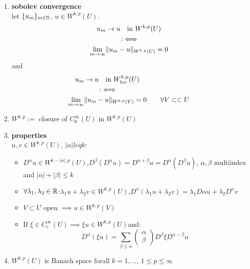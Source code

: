 \begin{enumerate}[label=(\alph*)]
	\item \textbf{sobolev convergence}\\
	let $\{u_m\}_{m\in \mathbb{N}}$, $u \in W^{k,p}(U)$. 
	\begin{align*}
		& \quad u_m \to u \quad \text{in } W^{k,p}(U)\\
		& \hspace{1.5cm}:\iff \\
		&\underset{m \to \infty}{\lim} \|u_m -u\|_{W^{k,p}(U)} = 0
	\end{align*}
	and
	\begin{align*}
	& \quad u_m \to u \quad \text{in } W^{k,p}_{\text{loc}}(U)\\
	& \hspace{1.5cm}:\iff \\
	&\underset{m \to \infty}{\lim} \|u_m -u\|_{W^{k,p}(V)} = 0 \qquad \forall V \subset\subset U
	\end{align*}
	
	\item $W^{k,p}:=$ closure of $C^\infty_0(U)$ in $W^{k,p}(U)$
	\item \textbf{properties}\\
	$u,v \in W^{k,p}(U)$, $|\alpha| leq k$:
	\begin{itemize}
		\item $D^{\alpha} u \in W^{k-|\alpha|,p}(U)$,\quad $D^{\beta}(D^{\alpha}u) = D^{\alpha+\beta}u =  D^{\alpha}(D^{\beta}u) $, $\alpha, \beta$ multiindex and $|\alpha| + |\beta| \leq k$
		\item $\forall \lambda_1, \lambda_2 \in \mathbb{R}$:\quad $\lambda_1 u +\lambda_2 v \in W^{k,p}(U)$,\quad $D^{\alpha}(\lambda_1 u +\lambda_2 v) = \lambda_1 D{\alpha}u + \lambda_2 D^{\alpha}v$
		\item $V \subset U$ open $\implies u \in W^{k,p}(V)$
		\item If $\xi \in C^\infty_c(U) \implies \xi u \in W^{k,p}(U)$\quad  and:
		\begin{equation*}
			D^{\alpha}(\xi u) = \displaystyle \sum_{\beta \leq \alpha}
			\begin{pmatrix}
			\alpha\\
			\beta
			\end{pmatrix} 
			D^{\beta}\xi D^{\alpha -\beta} u
		\end{equation*}
	\end{itemize}
	
	\item $W^{k,p}(U)$ is Banach space forall $k=1,\dots$, $1\leq p \leq \infty$
	
	
\end{enumerate}

